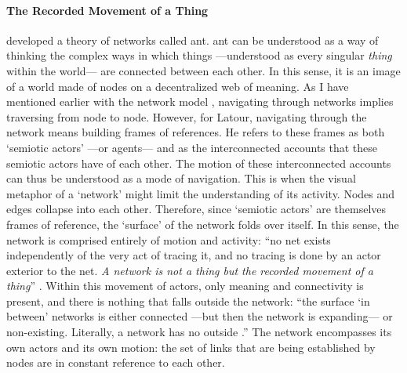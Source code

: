 



\paragraph{The Recorded Movement of a Thing}
\textcite{Lat90:On, Lat93:We} developed a theory of networks called \gls{ant}. \gls{ant} can be understood as a way of thinking the complex ways in which things ---understood as every singular \textit{thing} within the world--- are connected between each other. In this sense, it is an image of a world made of nodes on a decentralized web of meaning. As I have mentioned earlier with the network model , navigating through networks implies traversing from node to node. However, for Latour, navigating through the network means building frames of references. He refers to these frames as both `semiotic actors' ---or agents--- and as the interconnected accounts that these semiotic actors have of each other. The motion of these interconnected accounts can thus be understood as a mode of navigation. This is when the visual metaphor of a `network' might limit the understanding of its activity. Nodes and edges collapse into each other. Therefore, since `semiotic actors' are themselves frames of reference, the `surface' of the network folds over itself. In this sense, the network is comprised entirely of motion and activity: ``no net exists independently of the very act of tracing it, and no tracing is done by an actor exterior to the net. \textit{A network is not a thing but the recorded movement of a thing}'' \im \parencite[14]{Lat90:On}. Within this movement of actors, only meaning and connectivity is present, and there is nothing that falls outside the network: ``the surface `in between' networks is either connected ---but then the network is expanding--- or non-existing. Literally, a network has no outside \parencite[6]{Lat90:On}.'' The network encompasses its own actors and its own motion: the set of links that are being established by nodes are in constant reference to each other.


